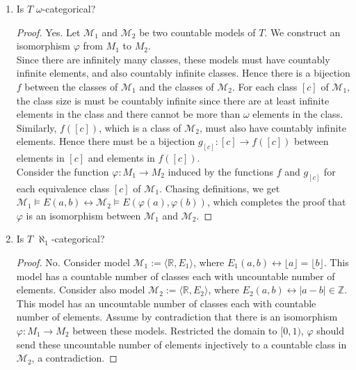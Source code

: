 \documentclass{article}
\begin{document}
\begin{enumerate}[label={\bf Q\arabic*:}]
\begin{enumerate}
      \item Is $T$ $\omega$-categorical?
        \begin{proof}
          Yes. Let $\mathcal{M}_1$ and $\mathcal{M}_2$ be two countable
          models of $T$. We construct an isomorphism $\varphi$ from $M_1$
          to $M_2$. \\

          Since there are infinitely many classes, these
          models must have countably infinite elements, and also countably
          infinite classes. Hence there is a bijection $f$ between the
          classes of $\mathcal{M}_1$ and the classes of $\mathcal{M}_2$.
          For each class $[c]$ of $\mathcal{M}_1$, the class size is
          must be countably infinite since there are at least infinite
          elements in the class and there cannot be more than $\omega$
          elements in the class. Similarly, $f([c])$, which is a class of
          $\mathcal{M}_2$, must also have countably infinite elements.
          Hence there must be a bijection $g_{[c]}:[c]\rightarrow f([c])$
          between elements in $[c]$ and elements in $f([c])$. \\

          Consider the function $\varphi:M_1\rightarrow M_2$ induced by the
          functions $f$ and $g_{[c]}$ for each equivalence class $[c]$ of
          $\mathcal{M}_1$. Chasing definitions, we get
          $\mathcal{M}_1\models E(a,b) \leftrightarrow \mathcal{M}_2\models
          E(\varphi(a),\varphi(b))$, which completes the proof that
          $\varphi$ is an isomorphism between $\mathcal{M}_1$ and
          $\mathcal{M}_2$.
        \end{proof}

      \item Is $T$ $\aleph_1$-categorical?
        \begin{proof}
          No. Consider model $\mathcal{M}_1:=\langle\mathbb{R},E_1\rangle$,
          where $E_1(a,b)\leftrightarrow\lfloor a\rfloor=\lfloor b\rfloor$.
          This model has a countable number of classes each with
          uncountable number of elements. Consider also model
          $\mathcal{M}_2:=\langle\mathbb{R},E_2\rangle$, where
          $E_2(a,b)\leftrightarrow|a-b|\in\mathbb{Z}$. This model has an
          uncountable number of classes each with countable number of
          elements. Assume by contradiction that there is an isomorphism
          $\varphi:M_1\rightarrow M_2$ between these models. Restricted the
          domain to $[0,1)$, $\varphi$ should send these uncountable number
          of elements injectively to a countable class in $\mathcal{M}_2$,
          a contradiction.
        \end{proof}


\end{enumerate}
\end{enumerate}
\end{document}
